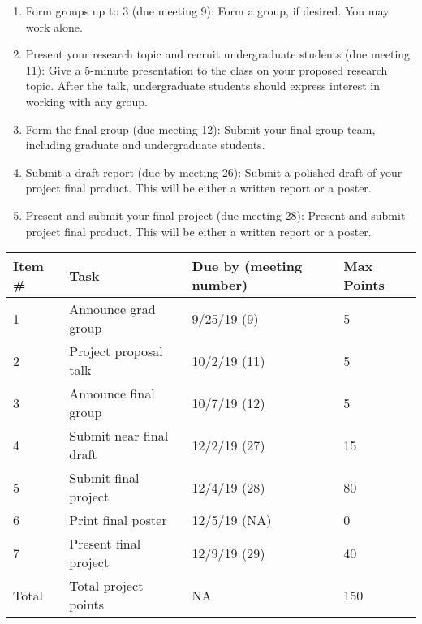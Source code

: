 \documentclass[11pt,onecolumn]{article}
\begin{document}
\begin{enumerate}
  \itemsep0em
\item Form groups up to 3 (due meeting 9): Form a group, if desired. You may work alone.
\item Present your research topic and recruit undergraduate students (due meeting 11): Give a 5-minute presentation to the class on your proposed research topic. After the talk, undergraduate students should express interest in working with any group.
\item Form the final group (due meeting 12): Submit your final group team, including graduate and undergraduate students.
\item Submit a draft report (due by meeting 26): Submit a polished draft of your project final product. This will be either a written report or a poster.
\item Present and submit your final project (due meeting 28): Present and submit project final product. This will be either a written report or a poster.
  
\end{enumerate}

\begin{table}
  \centering
  \begin{tabular}{l|lll}
    Item \# & Task & Due by (meeting number) & Max Points \\
    \hline
    1 & Announce grad group & 9/25/19 (9) & 5 \\
    2 & Project proposal talk & 10/2/19 (11) & 5 \\
    3 & Announce final group & 10/7/19 (12) & 5 \\
    4 & Submit near final draft & 12/2/19 (27) & 15 \\
    5 & Submit final project & 12/4/19 (28) & 80 \\
    6 & Print final poster & 12/5/19 (NA) & 0 \\
    7 & Present final project & 12/9/19 (29) & 40 \\
    \hline
    Total & Total project points & NA & 150 \\
  \end{tabular}
\end{table}
\end{document}
